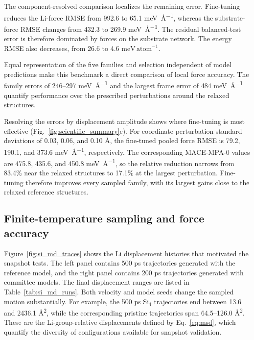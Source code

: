 

The component-resolved comparison localizes the remaining error. Fine-tuning
reduces the Li-force RMSE from 992.6 to 65.1 \si{\milli\electronvolt\per\angstrom}, whereas the
substrate-force RMSE changes from 432.3 to 269.9 \si{\milli\electronvolt\per\angstrom}. The residual
balanced-test error is therefore dominated by forces on the substrate network.
The energy RMSE also decreases, from 26.6 to 4.6 \(\mathrm{meV}\,\mathrm{atom}^{-1}\).

Equal representation of the five families and selection independent of model
predictions make this benchmark a direct comparison of local force accuracy.
The family errors of 246--297 \si{\milli\electronvolt\per\angstrom} and the largest
frame error of 484 \si{\milli\electronvolt\per\angstrom} quantify performance over
the prescribed perturbations around the relaxed structures.

Resolving the errors by displacement amplitude shows where fine-tuning is most effective
(Fig.~\ref{fig:scientific_summary}c). For
coordinate perturbation standard deviations of 0.03, 0.06, and 0.10 \AA{}, the
fine-tuned pooled force RMSE is 79.2, 190.1, and 373.6 \si{\milli\electronvolt\per\angstrom},
respectively. The corresponding MACE-MPA-0 values are 475.8, 435.6, and
450.8 \si{\milli\electronvolt\per\angstrom}, so the relative reduction narrows from 83.4\% near the
relaxed structures to 17.1\% at the largest perturbation. Fine-tuning therefore
improves every sampled family, with its largest gains close to the relaxed
reference structures.

\FloatBarrier
\subsection{Finite-temperature sampling and force accuracy}

Figure~\ref{fig:si_md_traces} shows the Li displacement histories that motivated
the snapshot tests. The left panel contains 500 ps trajectories generated with
the reference model, and the right panel contains 200 ps trajectories generated
with committee models. The final displacement ranges are listed in
Table~\ref{tab:si_md_runs}. Both velocity and model seeds change the sampled
motion substantially. For example, the 500 ps Si$_4$ trajectories end between
13.6 and 2436.1 \si{\angstrom\squared}, while the corresponding pristine trajectories span
64.5--126.0 \si{\angstrom\squared}. These are the Li-group-relative displacements defined by
Eq.~\ref{eq:msd}, which quantify the diversity of configurations available for
snapshot validation.

